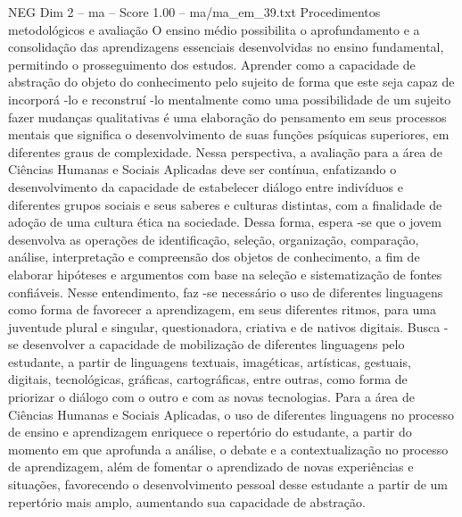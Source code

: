 \begin{textsample}{NEG Dim 2 – ma – Score 1.00 – ma/ma\_em\_39.txt}  \label{ex:f2_neg_236}
Procedimentos metodológicos e avaliação O ensino médio possibilita o aprofundamento e a consolidação das aprendizagens essenciais desenvolvidas no ensino fundamental, permitindo o prosseguimento dos estudos.
Aprender como a capacidade de abstração do objeto do conhecimento pelo sujeito de forma que este seja capaz de incorporá -lo e reconstruí -lo mentalmente como uma possibilidade de um sujeito fazer mudanças qualitativas é uma elaboração do pensamento em seus processos mentais que significa o desenvolvimento de suas funções psíquicas superiores, em diferentes graus de complexidade.
Nessa perspectiva, a avaliação para a área de Ciências Humanas e Sociais Aplicadas deve ser contínua, enfatizando o desenvolvimento da capacidade de estabelecer diálogo entre indivíduos e diferentes grupos sociais e seus saberes e culturas distintas, com a finalidade de adoção de uma cultura ética na sociedade.
Dessa forma, espera -se que o jovem desenvolva as operações de identificação, seleção, organização, comparação, análise, interpretação e compreensão dos objetos de conhecimento, a fim de elaborar hipóteses e argumentos com base na seleção e sistematização de fontes confiáveis.
Nesse entendimento, faz -se necessário o uso de diferentes linguagens como forma de favorecer a aprendizagem, em seus diferentes ritmos, para uma juventude plural e singular, questionadora, criativa e de nativos digitais.
Busca -se desenvolver a capacidade de mobilização de diferentes linguagens pelo estudante, a partir de linguagens textuais, imagéticas, artísticas, gestuais, digitais, tecnológicas, gráficas, cartográficas, entre outras, como forma de priorizar o diálogo com o outro e com as novas tecnologias.
Para a área de Ciências Humanas e Sociais Aplicadas, o uso de diferentes linguagens no processo de ensino e aprendizagem enriquece o repertório do estudante, a partir do momento em que aprofunda a análise, o debate e a contextualização no processo de aprendizagem, além de fomentar o aprendizado de novas experiências e situações, favorecendo o desenvolvimento pessoal desse estudante a partir de um repertório mais amplo, aumentando sua capacidade de abstração.

\end{textsample}
